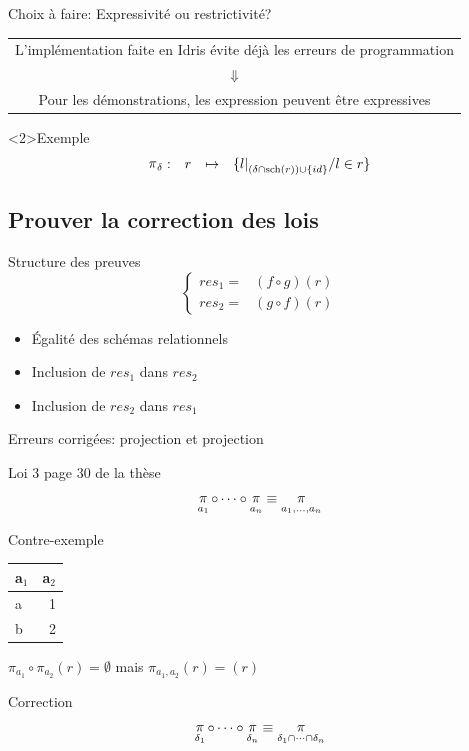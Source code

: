 \documentclass{beamer}
\DeclareMathOperator{\proj}{\mathchar"1119}
\DeclareMathOperator{\s}{sch}
\newcommand{\projDelta}{\proj_{\delta}}
\begin{document}
\begin{frame}{Choix à faire: Expressivité ou restrictivité?}
\begin{center}
\begin{tabular}{c}
L'implémentation faite en Idris évite déjà les erreurs de programmation \\
$\Downarrow$ \\
Pour les démonstrations, les expression peuvent être expressives
\end{tabular}
\end{center}
\begin{exampleblock}<2>{Exemple}
	$$
	\begin{array}{llcl}
	\projDelta:	& r		& \mapsto		& 
					\{{l|}_{(\delta\cap \s(r)) \cup \{id\}} / l \in r \}
	\end{array}
	$$
\end{exampleblock}
\end{frame}



\subsection{Prouver la correction des lois}
\begin{frame}{Structure des preuves}
$$
\left\lbrace
\begin{array}{cc}
res_1 = & (f \circ g) (r) \\
res_2 = & (g \circ f) (r)
\end{array}
\right.
$$
\begin{itemize}
\item Égalité des schémas relationnels
\item Inclusion de $res_1$ dans $res_2$
\item Inclusion de $res_2$ dans $res_1$
\end{itemize}
\end{frame}

\begin{frame}{Erreurs corrigées: projection et projection}
\begin{block}{Loi 3 page 30 de la thèse}
$$ 
\proj_{a_1} \circ \dots \circ \proj_{a_n} 
\equiv \proj_{a_1, \dots, a_n}
$$
\end{block}
\begin{block}{Contre-exemple}
\begin{tabular}{lr}
		a\(_{\text{1}}\) & a\(_{\text{2}}\)\\
		\hline
		a & 1\\
		b & 2\\
\end{tabular}

\(\pi_{a_1} \circ \pi_{a_2} (r) = \emptyset\)
mais
\(\pi_{a_1, a_2} (r) = (r)\)
\end{block}
\begin{exampleblock}{Correction}
$$
\proj_{\delta_1} \circ \dots \circ \proj_{\delta_n} 
\equiv \proj_{\delta_1 \cap \dots \cap \delta_n}
$$
\end{exampleblock}
\end{frame}
\end{document}
